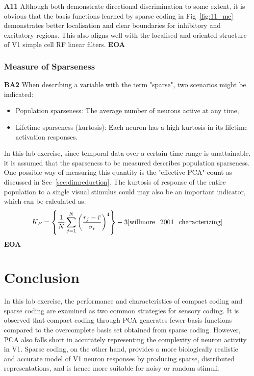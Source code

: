 \documentclass[11pt, twocolumn]{article}
\begin{document}
\textbf{A11} Although both demonstrate directional discrimination to some extent, it is obvious that the basis functions learned by sparse coding in Fig~\ref{fig:11_me} demonstrates better localisation and clear boundaries for inhibitory and excitatory regions. This also aligns well with the localised and oriented structure of V1 simple cell RF linear filters. \textbf{EOA}

\subsubsection{Measure of Sparseness}
\textbf{BA2} When describing a variable with the term "sparse", two scenarios might be indicated:
\begin{itemize}
    \item Population sparseness: The average number of neurons active at any time,
    \item Lifetime sparseness (kurtosis): Each neuron has a high kurtosis in its lifetime activation responses. \cite{willmore_2001_characterizing}
\end{itemize}

In this lab exercise, since temporal data over a certain time range is unattainable, it is assumed that the sparseness to be measured describes population sparseness. One possible way of measuring this quantity is the "effective PCA" count as discussed in Sec~\ref{sec:dimreduction}.
The kurtosis of response of the entire population to a single visual stimulus could may also be an important indicator, which can be calculated as:
\begin{equation}
    K_P = \left\{ \frac{1}{N} \sum_{j=1}^N \left( \frac{r_j - \bar{r}}{\sigma_r} \right)^4 \right\} - 3  \cite{willmore_2001_characterizing}
\end{equation}
\textbf{EOA}


\section{Conclusion}
In this lab exercise, the performance and characteristics of compact coding and sparse coding are examined as two common strategies for sensory coding. It is observed that compact coding through PCA generates fewer basis functions compared to the overcomplete basis set obtained from sparse coding. However, PCA also falls short in accurately representing the complexity of neuron activity in V1. Sparse coding, on the other hand, provides a more biologically realistic and accurate model of V1 neuron responses by producing sparse, distributed representations, and is hence more suitable for noisy or random stimuli.
\end{document}

